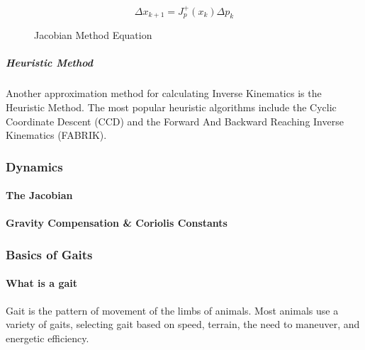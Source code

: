                 \begin{figure}
                    \centering
                    $$\Delta x_{k+1} = J_p^+ (x_k)\Delta p_k 
                    $$
                    \caption{Jacobian Method Equation}
                    \label{fig:ikin_jacobian}
                \end{figure}
            \subparagraph*{Heuristic Method}
                Another approximation method for calculating Inverse Kinematics is the Heuristic Method. The most popular heuristic algorithms include the Cyclic Coordinate Descent (CCD) \cite{ikin_CCD} and the Forward And Backward Reaching Inverse Kinematics (FABRIK). \cite{ikin_FABRIK}
                
        \subsubsection{Dynamics}
            \paragraph*{The Jacobian} \label{subsec:jacobians}

            \paragraph*{Gravity Compensation \& Coriolis Constants}

        \subsubsection{Basics of Gaits}
            \paragraph*{What is a gait}
            Gait is the pattern of movement of the limbs of animals. Most animals use a variety of gaits, selecting gait based on speed, terrain, the need to maneuver, and energetic efficiency. \cite{wikipedia_2018_Gaits} 

